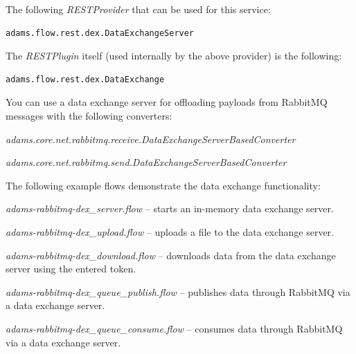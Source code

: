 \documentclass[a4paper]{book}
\begin{document}
\noindent The following \textit{RESTProvider} that can be used for this service:
\begin{verbatim}
adams.flow.rest.dex.DataExchangeServer
\end{verbatim}

\noindent The \textit{RESTPlugin} itself (used internally by the above provider)
is the following:
\begin{verbatim}
adams.flow.rest.dex.DataExchange
\end{verbatim}

\noindent You can use a data exchange server for offloading payloads from
RabbitMQ messages with the following converters:
\begin{tight_itemize}
  \item \textit{adams.core.net.rabbitmq.receive.DataExchangeServerBasedConverter}
  \item \textit{adams.core.net.rabbitmq.send.DataExchangeServerBasedConverter}
\end{tight_itemize}

\noindent The following example flows demonstrate the data exchange functionality:
\begin{tight_itemize}
  \item \textit{adams-rabbitmq-dex\_server.flow} -- starts an in-memory data exchange server.
  \item \textit{adams-rabbitmq-dex\_upload.flow} -- uploads a file to the data exchange server.
  \item \textit{adams-rabbitmq-dex\_download.flow} -- downloads data from the data exchange server using the entered token.
  \item \textit{adams-rabbitmq-dex\_queue\_publish.flow} -- publishes data through RabbitMQ via a data exchange server.
  \item \textit{adams-rabbitmq-dex\_queue\_consume.flow} -- consumes data through RabbitMQ via a data exchange server.
\end{tight_itemize}


\end{document}
